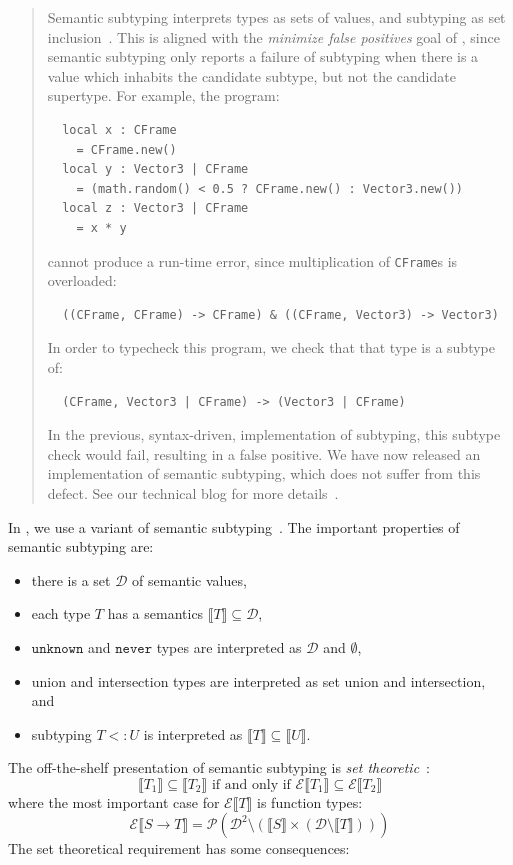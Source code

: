\documentclass[acmsmall,review,screen]{acmart}
\newcommand{\NEVER}{\mathtt{never}}
\newcommand{\UNKNOWN}{\mathtt{unknown}}
\newcommand{\fun}{\mathbin{\rightarrow}}
\newcommand{\sem}[1]{\llbracket{#1}\rrbracket}
\newcommand{\Val}{\mathcal{D}}
\begin{document}
\begin{quote}\em
  
Semantic subtyping
interprets types as sets of values, and subtyping as set
inclusion~\cite{GF05:GentleIntroduction}. This is aligned with the
\emph{minimize false positives} goal of , since
semantic subtyping only reports a failure of subtyping when there is a
value which inhabits the candidate subtype, but not the candidate
supertype.
For example, the program:
\begin{verbatim}
  local x : CFrame
    = CFrame.new()
  local y : Vector3 | CFrame
    = (math.random() < 0.5 ? CFrame.new() : Vector3.new())
  local z : Vector3 | CFrame
    = x * y
\end{verbatim}
cannot produce a run-time error, since multiplication of \verb|CFrame|s is overloaded:
\begin{verbatim}
  ((CFrame, CFrame) -> CFrame) & ((CFrame, Vector3) -> Vector3)
\end{verbatim}
In order to typecheck this program, we check that that type is a subtype of:
\begin{verbatim}
  (CFrame, Vector3 | CFrame) -> (Vector3 | CFrame)
\end{verbatim}
In the previous, syntax-driven, implementation of subtyping, this subtype check  would fail, resulting in a false positive.
We have now released an implementation of semantic subtyping, which does not suffer from this defect.
See our technical blog for more details~.

\end{quote}
%
In , we use a variant of semantic
subtyping~\cite{GF05:GentleIntroduction,FCB08:SemanticSubtyping,Ken21:DownDirty}. The
important properties of semantic subtyping are:
\begin{itemize}
\item there is a set $\Val$ of semantic values,
\item each type $T$ has a semantics $\sem{T} \subseteq \Val$,
\item $\UNKNOWN$ and $\NEVER$ types are interpreted as $\Val$ and $\emptyset$,
\item union and intersection types are interpreted as set union and intersection, and
\item subtyping $T <: U$ is interpreted as $\sem{T} \subseteq \sem{U}$.
\end{itemize}
The off-the-shelf presentation of semantic subtyping is \emph{set theoretic}~\cite[\S2.5]{GF05:GentleIntroduction}:
\[
  \sem{T_1} \subseteq \sem{T_2} \mbox{ if and only if }
  \mathcal{E}\sem{T_1} \subseteq \mathcal{E}\sem{T_2}
\]
where the most important case for $\mathcal{E}\sem{T}$ is function types:
\[
  \mathcal{E}\sem{S \fun T} = \mathcal{P}(\Val^2 \setminus (\sem{S} \times (\Val \setminus \sem{T})))
\]
The set theoretical requirement has some consequences:
  
\end{document}
